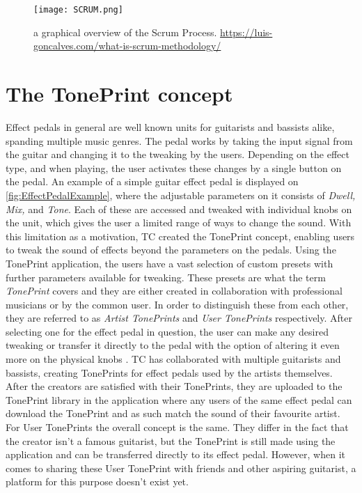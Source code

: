%
\begin{figure}[H]
	\centering
	\texttt{[image: SCRUM.png]}
	\caption{a graphical overview of the Scrum Process. \url{https://luis-goncalves.com/what-is-scrum-methodology/}}
	\label{fig:ScrumExplanation}
\end{figure}
%

\section{The TonePrint concept}
\label{TonePrintConceptDefined}
Effect pedals in general are well known units for guitarists and bassists alike, spanding multiple music genres. The pedal works by taking the input signal from the guitar and changing it to the tweaking by the users. Depending on the effect type, and when playing, the user activates these changes by a single button on the pedal. An example of a simple guitar effect pedal is displayed on \autoref{fig:EffectPedalExample}, where the adjustable parameters on it consists of \textit{Dwell, Mix,} and \textit{Tone}. Each of these are accessed and tweaked with individual knobs on the unit, which gives the user a limited range of ways to change the sound. With this limitation as a motivation, TC created the TonePrint concept, enabling users to tweak the sound of effects beyond the parameters on the pedals. Using the TonePrint application, the users have a vast selection of custom presets with further parameters available for tweaking. These presets are what the term \textit{TonePrint} covers and they are either created in collaboration with professional musicians or by the common user. In order to distinguish these from each other, they are referred to as \textit{Artist TonePrints} and \textit{User TonePrints} respectively. After selecting one for the effect pedal in question, the user can make any desired tweaking or transfer it directly to the pedal with the option of altering it even more on the physical knobs \parencite{PDF:TonePrintAnalyse}. TC has collaborated with multiple guitarists and bassists, creating TonePrints for effect pedals used by the artists themselves. After the creators are satisfied with their TonePrints, they are uploaded to the TonePrint library in the application where any users of the same effect pedal can download the TonePrint and as such match the sound of their favourite artist. For User TonePrints the overall concept is the same. They differ in the fact that the creator isn't a famous guitarist, but the TonePrint is still made using the application and can be transferred directly to its effect pedal. However, when it comes to sharing these User TonePrint with friends and other aspiring guitarist, a platform for this purpose doesn't exist yet.

